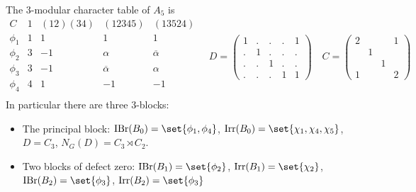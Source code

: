 \documentclass[fontsize=11pt,fleqn,a4paper]{scrartcl}
\begin{document}
\begin{theorem}
The $3$-modular character table of $A_5$ is
\[\begin{array}{c|cccc}
C & 1 & (12)(34) & (12345) & (13524) \\
 \hline\hline
\phi_1 & 1 & 1 & 1 & 1 \\
\phi_2 & 3 & -1 & \alpha & \overline{\alpha} \\
\phi_3 & 3 & -1 & \overline{\alpha} & \alpha \\
\phi_4 & 4 & 1 & -1 & -1 \\
\end{array}
\quad
D=\begin{pmatrix}
1 & . & . & . & 1 \\
. & 1 & . & . & . \\
. & . & 1 & . & . \\
. & . & . & 1 & 1
\end{pmatrix}
\quad
C=\begin{pmatrix}
2 &   &   & 1 \\
  & 1 &   &   \\
  &   & 1 &   \\
1 &   &   & 2  
\end{pmatrix}\]
In particular there are three $3$-blocks:
\begin{itemize}
\item The principal block:
$\IBr(B_0)=\set{\phi_1,\phi_4}$,
$\Irr(B_0)=\set{\chi_1,\chi_4,\chi_5}$,
$D=C_3$, $N_G(D) = C_3 \rtimes C_2$.
\item Two blocks of defect zero:
$\IBr(B_1)=\set{\phi_2}$,
$\Irr(B_1)=\set{\chi_2}$,
$\IBr(B_2)=\set{\phi_3}$,
$\Irr(B_2)=\set{\phi_3}$
\end{itemize}
\end{theorem}
\end{document}
